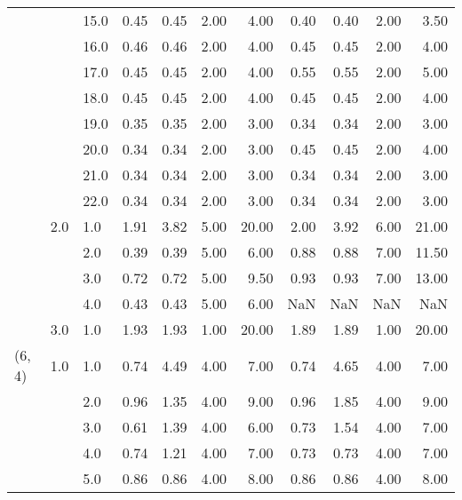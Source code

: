 \begin{tabular}{lllrrrrrrrr}
       &     & 15.0 &       0.45 &      0.45 & 2.00 &   4.00 &       0.40 &      0.40 & 2.00 &   3.50 \\
       &     & 16.0 &       0.46 &      0.46 & 2.00 &   4.00 &       0.45 &      0.45 & 2.00 &   4.00 \\
       &     & 17.0 &       0.45 &      0.45 & 2.00 &   4.00 &       0.55 &      0.55 & 2.00 &   5.00 \\
       &     & 18.0 &       0.45 &      0.45 & 2.00 &   4.00 &       0.45 &      0.45 & 2.00 &   4.00 \\
       &     & 19.0 &       0.35 &      0.35 & 2.00 &   3.00 &       0.34 &      0.34 & 2.00 &   3.00 \\
       &     & 20.0 &       0.34 &      0.34 & 2.00 &   3.00 &       0.45 &      0.45 & 2.00 &   4.00 \\
       &     & 21.0 &       0.34 &      0.34 & 2.00 &   3.00 &       0.34 &      0.34 & 2.00 &   3.00 \\
       &     & 22.0 &       0.34 &      0.34 & 2.00 &   3.00 &       0.34 &      0.34 & 2.00 &   3.00 \\
       & 2.0 & 1.0  &       1.91 &      3.82 & 5.00 &  20.00 &       2.00 &      3.92 & 6.00 &  21.00 \\
       &     & 2.0  &       0.39 &      0.39 & 5.00 &   6.00 &       0.88 &      0.88 & 7.00 &  11.50 \\
       &     & 3.0  &       0.72 &      0.72 & 5.00 &   9.50 &       0.93 &      0.93 & 7.00 &  13.00 \\
       &     & 4.0  &       0.43 &      0.43 & 5.00 &   6.00 &        NaN &       NaN &  NaN &    NaN \\
       & 3.0 & 1.0  &       1.93 &      1.93 & 1.00 &  20.00 &       1.89 &      1.89 & 1.00 &  20.00 \\
(6, 4) & 1.0 & 1.0  &       0.74 &      4.49 & 4.00 &   7.00 &       0.74 &      4.65 & 4.00 &   7.00 \\
       &     & 2.0  &       0.96 &      1.35 & 4.00 &   9.00 &       0.96 &      1.85 & 4.00 &   9.00 \\
       &     & 3.0  &       0.61 &      1.39 & 4.00 &   6.00 &       0.73 &      1.54 & 4.00 &   7.00 \\
       &     & 4.0  &       0.74 &      1.21 & 4.00 &   7.00 &       0.73 &      0.73 & 4.00 &   7.00 \\
       &     & 5.0  &       0.86 &      0.86 & 4.00 &   8.00 &       0.86 &      0.86 & 4.00 &   8.00 \\

\end{tabular}
